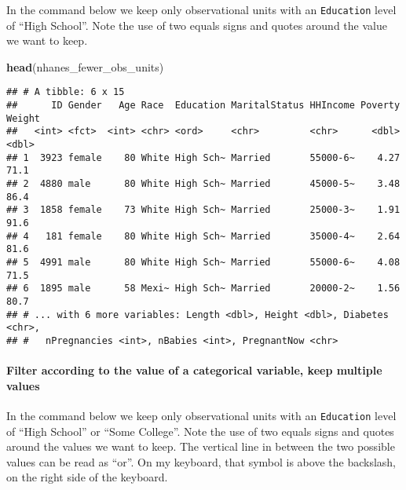 \documentclass[]{article}
\newenvironment{Shaded}{\begin{snugshade}}{\end{snugshade}}
\newcommand{\KeywordTok}[1]{\textcolor[rgb]{0.13,0.29,0.53}{\textbf{#1}}}
\newcommand{\StringTok}[1]{\textcolor[rgb]{0.31,0.60,0.02}{#1}}
\newcommand{\OperatorTok}[1]{\textcolor[rgb]{0.81,0.36,0.00}{\textbf{#1}}}
\newcommand{\NormalTok}[1]{#1}
\let\oldparagraph\paragraph
\renewcommand{\paragraph}[1]{\oldparagraph{#1}\mbox{}}
\begin{document}
In the command below we keep only observational units with an
\texttt{Education} level of ``High School''. Note the use of two equals
signs and quotes around the value we want to keep.

\begin{Shaded}
\end{Shaded}

\begin{Shaded}
\begin{Highlighting}[]
\KeywordTok{head}\NormalTok{(nhanes_fewer_obs_units)}
\end{Highlighting}
\end{Shaded}

\begin{verbatim}
## # A tibble: 6 x 15
##      ID Gender   Age Race  Education MaritalStatus HHIncome Poverty Weight
##   <int> <fct>  <int> <chr> <ord>     <chr>         <chr>      <dbl>  <dbl>
## 1  3923 female    80 White High Sch~ Married       55000-6~    4.27   71.1
## 2  4880 male      80 White High Sch~ Married       45000-5~    3.48   86.4
## 3  1858 female    73 White High Sch~ Married       25000-3~    1.91   91.6
## 4   181 female    80 White High Sch~ Married       35000-4~    2.64   81.6
## 5  4991 male      80 White High Sch~ Married       55000-6~    4.08   71.5
## 6  1895 male      58 Mexi~ High Sch~ Married       20000-2~    1.56   80.7
## # ... with 6 more variables: Length <dbl>, Height <dbl>, Diabetes <chr>,
## #   nPregnancies <int>, nBabies <int>, PregnantNow <chr>
\end{verbatim}

\paragraph{Filter according to the value of a categorical variable, keep
multiple
values}\label{filter-according-to-the-value-of-a-categorical-variable-keep-multiple-values}

In the command below we keep only observational units with an
\texttt{Education} level of ``High School'' or ``Some College''. Note
the use of two equals signs and quotes around the values we want to
keep. The vertical line in between the two possible values can be read
as ``or''. On my keyboard, that symbol is above the backslash, on the
right side of the keyboard.
\end{document}
